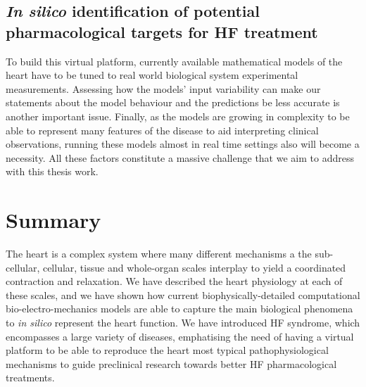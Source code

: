 \subsection{\textit{In silico} identification of potential pharmacological targets for HF treatment}
To build this virtual platform, currently available mathematical models of the heart have to be tuned to real world biological system experimental measurements. Assessing how the models' input variability can make our statements about the model behaviour and the predictions be less accurate is another important issue. Finally, as the models are growing in complexity to be able to represent many features of the disease to aid interpreting clinical observations, running these models almost in real time settings also will become a necessity. All these factors constitute a massive challenge that we aim to address with this thesis work.


%
%
%
\section{Summary}\label{sec:ch1summary}
The heart is a complex system where many different mechanisms a the sub-cellular, cellular, tissue and whole-organ scales interplay to yield a coordinated contraction and relaxation. We have described the heart physiology at each of these scales, and we have shown how current biophysically-detailed computational bio-electro-mechanics models are able to capture the main biological phenomena to \textit{in silico} represent the heart function. We have introduced HF syndrome, which encompasses a large variety of diseases, emphatising the need of having a virtual platform to be able to reproduce the heart most typical pathophysiological mechanisms to guide preclinical research towards better HF pharmacological treatments.

